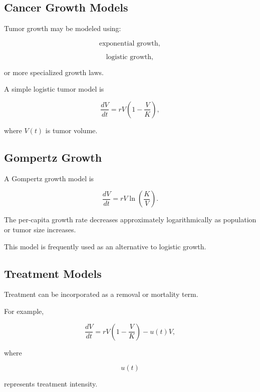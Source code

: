 \subsection{Cancer Growth Models}
\label{subsec:cancer-growth-models}

Tumor growth may be modeled using:

\[
\boxed{
\text{exponential growth},
}
\]

\[
\boxed{
\text{logistic growth},
}
\]

or more specialized growth laws.

A simple logistic tumor model is

\[
\boxed{
\frac{dV}{dt}
=
rV
\left(
1-\frac{V}{K}
\right),
}
\]

where \(V(t)\) is tumor volume.

\subsection{Gompertz Growth}
\label{subsec:gompertz-growth}

A Gompertz growth model is

\[
\boxed{
\frac{dV}{dt}
=
rV
\ln
\left(
\frac{K}{V}
\right).
}
\]

The per-capita growth rate decreases approximately logarithmically as
population or tumor size increases.

This model is frequently used as an alternative to logistic growth.

\subsection{Treatment Models}
\label{subsec:biological-treatment-models}

Treatment can be incorporated as a removal or mortality term.

For example,

\[
\boxed{
\frac{dV}{dt}
=
rV
\left(
1-\frac{V}{K}
\right)
-
u(t)V,
}
\]

where

\[
u(t)
\]

represents treatment intensity.

